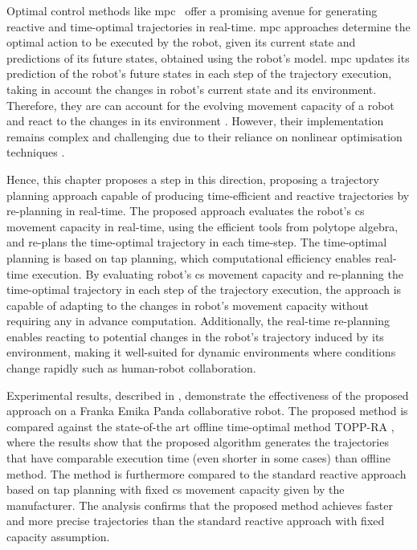 Optimal control methods like \gls{mpc}~\cite{Kouvaritakis2016} offer a promising avenue for generating reactive and time-optimal trajectories in real-time. \gls{mpc} approaches determine the optimal action to be executed by the robot, given its current state and predictions of its future states, obtained using the robot's model. \gls{mpc} updates its prediction of the robot's future states in each step of the trajectory execution, taking in account the changes in robot's current state and its environment. Therefore, they are can account for the evolving movement capacity of a robot and react to the changes in its environment \cite{torresalberto2022}\cite{Eckhoff2022}. However, their implementation remains complex and challenging due to their reliance on nonlinear optimisation techniques \cite{kelff2021,Massaro2023}.

Hence, this chapter proposes a step in this direction, proposing a trajectory planning approach capable of producing time-efficient and reactive trajectories by re-planning in real-time.  
The proposed approach evaluates the robot's \gls{cs} movement capacity in real-time, using the efficient tools from polytope algebra, and re-plans the time-optimal trajectory in each time-step. The time-optimal planning is based on \gls{tap} \cite{modernrobotics} planning, which  computational efficiency enables real-time execution. 
By evaluating robot's \gls{cs} movement capacity and re-planning the time-optimal trajectory in each step of the trajectory execution, the approach is capable of adapting to the changes in robot's movement capacity without requiring any in advance computation. 
Additionally, the real-time re-planning enables reacting to potential changes in the robot's trajectory induced by its environment, making it well-suited for dynamic environments where conditions change rapidly such as human-robot collaboration. 

Experimental results, described in , demonstrate the effectiveness of the proposed approach on a Franka Emika Panda collaborative robot. The proposed method is compared against the state-of-the art offline time-optimal method TOPP-RA \cite{Pham2018}, where the results show that the proposed algorithm generates the trajectories that have comparable execution time (even shorter in some cases) than offline method.
The method is furthermore compared to the standard reactive approach based on \gls{tap} planning with fixed \gls{cs} movement capacity given by the manufacturer.  The analysis confirms that the proposed method achieves faster and more precise trajectories than the standard reactive approach with fixed capacity assumption. 


